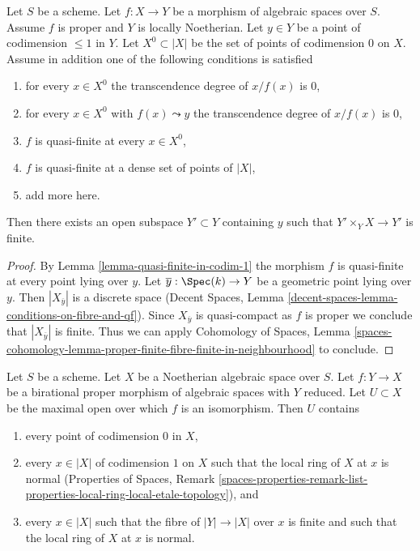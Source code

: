 \begin{lemma}
\label{lemma-finite-in-codim-1}
Let $S$ be a scheme. Let $f : X \to Y$ be a morphism of algebraic spaces
over $S$. Assume $f$ is proper and $Y$ is locally Noetherian.
Let $y \in Y$ be a point of codimension $\leq 1$ in $Y$.
Let $X^0 \subset |X|$ be the set of points of codimension $0$ on $X$.
Assume in addition one of the
following conditions is satisfied
\begin{enumerate}
\item for every $x \in X^0$ the transcendence degree of $x/f(x)$ is $0$,
\item for every $x \in X^0$ with $f(x) \leadsto y$ the transcendence degree
of $x/f(x)$ is $0$,
\item $f$ is quasi-finite at every $x \in X^0$,
\item $f$ is quasi-finite at a dense set of points of $|X|$,
\item add more here.
\end{enumerate}
Then there exists an open subspace $Y' \subset Y$ containing $y$ such that
$Y' \times_Y X \to Y'$ is finite.
\end{lemma}

\begin{proof}
By Lemma \ref{lemma-quasi-finite-in-codim-1} the morphism $f$ is
quasi-finite at every point lying over $y$. Let $\overline{y} : \Spec(k) \to Y$
be a geometric point lying over $y$. Then $|X_{\overline{y}}|$ is a
discrete space (Decent Spaces, Lemma
\ref{decent-spaces-lemma-conditions-on-fibre-and-qf}).
Since $X_{\overline{y}}$ is quasi-compact as $f$ is proper we conclude
that $|X_{\overline{y}}|$ is finite.
Thus we can apply Cohomology of Spaces, Lemma
\ref{spaces-cohomology-lemma-proper-finite-fibre-finite-in-neighbourhood}
to conclude.
\end{proof}

\begin{lemma}
\label{lemma-modification-normal-iso-over-codimension-1}
Let $S$ be a scheme. Let $X$ be a Noetherian algebraic space over $S$.
Let $f : Y \to X$ be a birational proper morphism of algebraic spaces
with $Y$ reduced.
Let $U \subset X$ be the maximal open over which $f$ is an isomorphism.
Then $U$ contains
\begin{enumerate}
\item every point of codimension $0$ in $X$,
\item every $x \in |X|$ of codimension $1$ on $X$ such that the local ring of
$X$ at $x$ is normal (Properties of Spaces, Remark
\ref{spaces-properties-remark-list-properties-local-ring-local-etale-topology}),
and
\item every $x \in |X|$ such that the fibre of $|Y| \to |X|$ over $x$ is
finite and such that the local ring of $X$ at $x$ is normal.
\end{enumerate}
\end{lemma}

